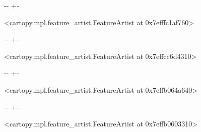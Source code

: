 \documentclass[letterpaper,10pt,english]{sphinxmanual}
\newlength\nbsphinxcodecellspacing
\begin{document}
{

\kern-\sphinxverbatimsmallskipamount\kern-\baselineskip
\kern+\FrameHeightAdjust\kern-\fboxrule
\vspace{\nbsphinxcodecellspacing}

\begin{sphinxVerbatim}[commandchars=\\\{\}]
\llap{\color{nbsphinxout}[58]:\,\hspace{\fboxrule}\hspace{\fboxsep}}<cartopy.mpl.feature\_artist.FeatureArtist at 0x7efffc1af760>
\end{sphinxVerbatim}
}

{

\kern-\sphinxverbatimsmallskipamount\kern-\baselineskip
\kern+\FrameHeightAdjust\kern-\fboxrule
\vspace{\nbsphinxcodecellspacing}

\begin{sphinxVerbatim}[commandchars=\\\{\}]
\llap{\color{nbsphinxout}[58]:\,\hspace{\fboxrule}\hspace{\fboxsep}}<cartopy.mpl.feature\_artist.FeatureArtist at 0x7effcc6d4310>
\end{sphinxVerbatim}
}

{

\kern-\sphinxverbatimsmallskipamount\kern-\baselineskip
\kern+\FrameHeightAdjust\kern-\fboxrule
\vspace{\nbsphinxcodecellspacing}

\begin{sphinxVerbatim}[commandchars=\\\{\}]
\llap{\color{nbsphinxout}[58]:\,\hspace{\fboxrule}\hspace{\fboxsep}}<cartopy.mpl.feature\_artist.FeatureArtist at 0x7effb064a640>
\end{sphinxVerbatim}
}

{

\kern-\sphinxverbatimsmallskipamount\kern-\baselineskip
\kern+\FrameHeightAdjust\kern-\fboxrule
\vspace{\nbsphinxcodecellspacing}

\begin{sphinxVerbatim}[commandchars=\\\{\}]
\llap{\color{nbsphinxout}[58]:\,\hspace{\fboxrule}\hspace{\fboxsep}}<cartopy.mpl.feature\_artist.FeatureArtist at 0x7effb0603310>
\end{sphinxVerbatim}
}
\end{document}
